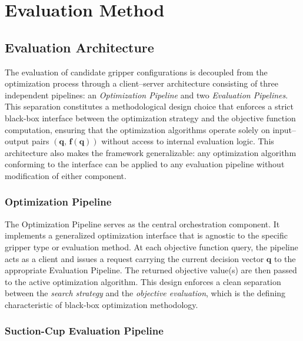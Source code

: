 \section{Evaluation Method}
\label{sec:methodology_evaluation}

\subsection{Evaluation Architecture}
\label{sec:methodology_evaluation_architecture}

The evaluation of candidate gripper configurations is decoupled from the optimization
process through a client--server architecture consisting of three independent pipelines:
an \emph{Optimization Pipeline} and two \emph{Evaluation Pipelines}. This separation
constitutes a methodological design choice that enforces a strict black-box interface
between the optimization strategy and the objective function computation, ensuring that
the optimization algorithms operate solely on input--output pairs
$(\mathbf{q},\, \mathbf{f}(\mathbf{q}))$ without access to internal evaluation logic.
This architecture also makes the framework generalizable: any optimization algorithm
conforming to the interface can be applied to any evaluation pipeline without
modification of either component.

\subsubsection{Optimization Pipeline}
\label{subsec:methodology_opt_pipeline}

The Optimization Pipeline serves as the central orchestration component.
It implements a generalized optimization interface that is agnostic to the specific
gripper type or evaluation method. At each objective function query, the pipeline
acts as a client and issues a request carrying the current decision vector
$\mathbf{q}$ to the appropriate Evaluation Pipeline. The returned objective
value(s) are then passed to the active optimization algorithm. This design
enforces a clean separation between the \emph{search strategy} and the
\emph{objective evaluation}, which is the defining characteristic of black-box
optimization methodology.

\subsubsection{Suction-Cup Evaluation Pipeline}
\label{subsec:methodology_sc_pipeline}

